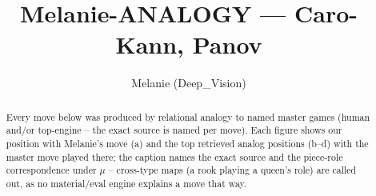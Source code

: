 \documentclass[11pt]{article}
\title{Melanie-ANALOGY — Caro-Kann, Panov}
\author{Melanie (Deep\_Vision)}
\date{}
\begin{document}
\maketitle

\begin{abstract}Every move below was produced by relational analogy to named master games (human and/or top-engine -- the exact source is named per move). Each figure shows our position with Melanie's move (a) and the top retrieved analog positions (b--d) with the master move played there; the caption names the exact source and the piece-role correspondence under $\mu$ -- cross-type maps (a rook playing a queen's role) are called out, as no material/eval engine explains a move that way.\end{abstract}

\begin{figure}[p]\centering
\begin{subfigure}{0.46\textwidth}\centering
\resizebox{\linewidth}{!}{%
\newchessgame
\chessboard[
  setfen={rnbqk2r/pp2bppp/4pn2/3p4/2PP3P/2N2N2/PP3PP1/R1BQKB1R b KQkq - 0 7},
  showmover=false,
  pgfstyle=straightmove, color=movearrow, markmove={e8-g8}
]}
\caption{}
\end{subfigure}\hfill
\begin{subfigure}{0.46\textwidth}\centering
\resizebox{\linewidth}{!}{%
\newchessgame
\chessboard[
  setfen={r1bqkb1r/pp3ppp/2n2n2/2pp4/3P4/4PN2/PP2BPPP/RNBQK2R w KQkq - 2 7},
  showmover=false,
  pgfstyle=straightmove, color=movearrow, markmove={e1-g1}
]}
\caption{}
\end{subfigure}
\\[4pt]
\begin{subfigure}{0.46\textwidth}\centering
\resizebox{\linewidth}{!}{%
\newchessgame
\chessboard[
  setfen={rnbqk2r/ppp1bppp/4pn2/3p4/2PP4/2N1PN2/PP3PPP/R1BQKB1R b KQkq - 0 5},
  showmover=false,
  pgfstyle=straightmove, color=movearrow, markmove={e8-g8}
]}
\caption{}
\end{subfigure}\hfill
\begin{subfigure}{0.46\textwidth}\centering
\resizebox{\linewidth}{!}{%
\newchessgame
\chessboard[
  setfen={rnbqk2r/ppp1bppp/4pn2/3p4/2PP4/2N1PN2/PP3PPP/R1BQKB1R b KQkq - 2 5},
  showmover=false,
  pgfstyle=straightmove, color=movearrow, markmove={e8-g8}
]}
\caption{}
\end{subfigure}

\end{figure}
\end{document}
